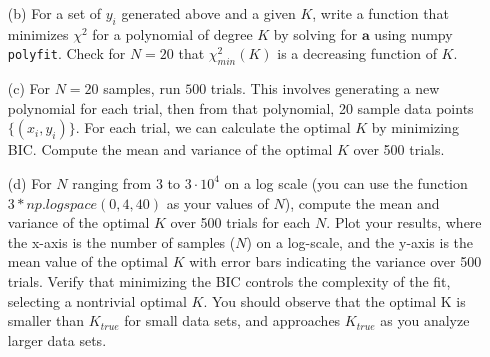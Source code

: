 \documentclass[submit]{harvardml}
\begin{document}
\begin{problem}
\begin{itemize}
        \item[(b)] For a set of $y_i$ generated above and a given $K$, write a function that minimizes $\chi^2$ for a polynomial of degree $K$ by solving for $\mathbf{a}$ using
                   numpy \texttt{polyfit}.                   Check for $N=20$ that $\chi^2_{min}(K)$ is a decreasing function of $K$. 
        
        \item[(c)] For $N=20$ samples, run $500$ trials. This involves generating a new polynomial for each trial, then from that polynomial, 20 sample data points $\{(x_i,y_i)\}$. For each trial, 
                          we can calculate the optimal $K$ by minimizing BIC. Compute the mean and variance of the optimal $K$ over 500 trials.
        
        \item[(d)] For $N$ ranging from $3$ to $3 \cdot 10^4$ on a log scale (you can use the function $3*np.logspace(0,4, 40)$ as your values of $N$), 
                   compute the mean and variance of the optimal $K$ over 500 trials for each $N$. Plot your results, where the x-axis is the number of samples ($N$) on a log-scale, 
                   and the y-axis is the mean value of the optimal $K$ with error bars indicating the variance over 500 trials. Verify that minimizing the BIC controls the complexity of the fit, 
                   selecting a nontrivial optimal $K$. You should observe that the optimal K is smaller than $K_{true}$ for small data sets, and approaches $K_{true}$ as you 
                   analyze larger data sets.
        
    \end{itemize}


\end{problem}
\end{document}
